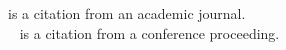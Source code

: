 \cite{Quille2019} is a citation from an academic journal.\\\
\cite{Quille:Gender} is a citation from a conference proceeding.